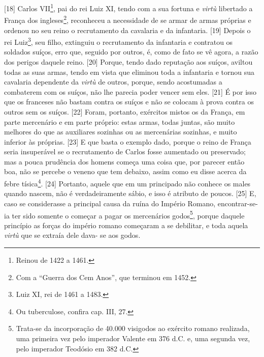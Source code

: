 {[}18{]} Carlos VII\footnote{Reinou de 1422 a 1461.}, pai do rei Luiz
XI, tendo com a sua fortuna e \emph{virtù} libertado a França dos
ingleses\footnote{Com a ``Guerra dos Cem Anos'', que terminou em 1452.},
reconheceu a necessidade de se armar de armas próprias e ordenou no seu
reino o recrutamento da cavalaria e da infantaria. {[}19{]} Depois o rei
Luiz\footnote{Luiz XI, rei de 1461 a 1483.}, seu filho, extinguiu o
recrutamento da infantaria e contratou os soldados suíços, erro que,
seguido por outros, é, como de fato se vê agora, a razão dos perigos
daquele reino. {[}20{]} Porque, tendo dado reputação aos suíços, aviltou
todas as suas armas, tendo em vista que eliminou toda a infantaria e
tornou sua cavalaria dependente da \emph{virtù} de outros, porque, sendo
acostumadas a combaterem com os suíços, não lhe parecia poder vencer sem
eles. {[}21{]} É por isso que os franceses não bastam contra os suíços e
não se colocam à prova contra os outros sem os suíços. {[}22{]} Foram,
portanto, exércitos mistos os da França, em parte mercenário e em parte
próprio: estas armas, todas juntas, são muito melhores do que as
auxiliares sozinhas ou as mercenárias sozinhas, e muito inferior às
próprias. {[}23{]} E que basta o exemplo dado, porque o reino de França
seria insuperável se o recrutamento de Carlos fosse aumentado ou
preservado; mas a pouca prudência dos homens começa uma coisa que, por
parecer então boa, não se percebe o veneno que tem debaixo, assim como
eu disse acerca da febre tísica\footnote{Ou tuberculose, confira cap.
  III, 27.}. {[}24{]} Portanto, aquele que em um principado não conhece
os males quando nascem, não é verdadeiramente sábio, e isso é atributo
de poucos. {[}25{]} E, caso se considerasse a principal causa da ruína
do Império Romano, encontrar-se-ia ter sido somente o começar a pagar os
mercenários godos\footnote{Trata-se da incorporação de 40.000 visigodos
  ao exército romano realizada, uma primeira vez pelo imperador Valente
  em 376 d.C. e, uma segunda vez, pelo imperador Teodósio em 382 d.C.},
porque daquele princípio as forças do império romano começaram a se
debilitar, e toda aquela \emph{virtù} que se extraía dele dava- se aos
godos.

